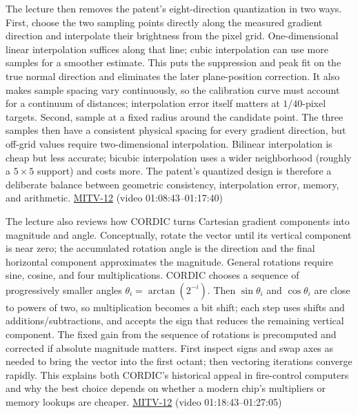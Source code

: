 The lecture then removes the patent's eight-direction quantization in two ways. First, choose the two sampling points directly along the measured gradient direction and interpolate their brightness from the pixel grid. One-dimensional linear interpolation suffices along that line; cubic interpolation can use more samples for a smoother estimate. This puts the suppression and peak fit on the true normal direction and eliminates the later plane-position correction. It also makes sample spacing vary continuously, so the calibration curve must account for a continuum of distances; interpolation error itself matters at \(1/40\)-pixel targets. Second, sample at a fixed radius around the candidate point. The three samples then have a consistent physical spacing for every gradient direction, but off-grid values require two-dimensional interpolation. Bilinear interpolation is cheap but less accurate; bicubic interpolation uses a wider neighborhood (roughly a \(5\times5\) support) and costs more. The patent's quantized design is therefore a deliberate balance between geometric consistency, interpolation error, memory, and arithmetic. \hyperref[04-visual-computing-ii-ch036-mitv-12---blob-analysis-binary-image-processing-greens-theorem-derivative-and-integral]{MITV-12} (video 01:08:43--01:17:40)

The lecture also reviews how CORDIC turns Cartesian gradient components into magnitude and angle. Conceptually, rotate the vector until its vertical component is near zero; the accumulated rotation angle is the direction and the final horizontal component approximates the magnitude. General rotations require sine, cosine, and four multiplications. CORDIC chooses a sequence of progressively smaller angles \(\theta_i=\arctan(2^{-i})\). Then \(\sin\theta_i\) and \(\cos\theta_i\) are close to powers of two, so multiplication becomes a bit shift; each step uses shifts and additions/subtractions, and accepts the sign that reduces the remaining vertical component. The fixed gain from the sequence of rotations is precomputed and corrected if absolute magnitude matters. First inspect signs and swap axes as needed to bring the vector into the first octant; then vectoring iterations converge rapidly. This explains both CORDIC's historical appeal in fire-control computers and why the best choice depends on whether a modern chip's multipliers or memory lookups are cheaper. \hyperref[04-visual-computing-ii-ch036-mitv-12---blob-analysis-binary-image-processing-greens-theorem-derivative-and-integral]{MITV-12} (video 01:18:43--01:27:05)

